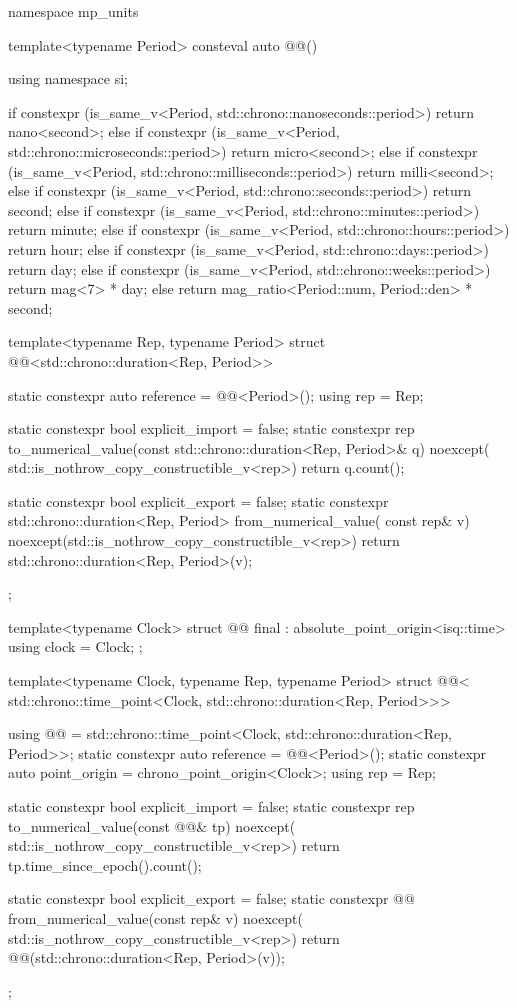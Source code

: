 \begin{codeblock}
namespace mp_units {

template<typename Period>
consteval auto @@()
{
  using namespace si;

  if constexpr (is_same_v<Period, std::chrono::nanoseconds::period>)
    return nano<second>;
  else if constexpr (is_same_v<Period, std::chrono::microseconds::period>)
    return micro<second>;
  else if constexpr (is_same_v<Period, std::chrono::milliseconds::period>)
    return milli<second>;
  else if constexpr (is_same_v<Period, std::chrono::seconds::period>)
    return second;
  else if constexpr (is_same_v<Period, std::chrono::minutes::period>)
    return minute;
  else if constexpr (is_same_v<Period, std::chrono::hours::period>)
    return hour;
  else if constexpr (is_same_v<Period, std::chrono::days::period>)
    return day;
  else if constexpr (is_same_v<Period, std::chrono::weeks::period>)
    return mag<7> * day;
  else
    return mag_ratio<Period::num, Period::den> * second;
}

template<typename Rep, typename Period>
struct @@<std::chrono::duration<Rep, Period>> {
  static constexpr auto reference = @@<Period>();
  using rep = Rep;

  static constexpr bool explicit_import = false;
  static constexpr rep to_numerical_value(const std::chrono::duration<Rep, Period>& q) noexcept(
    std::is_nothrow_copy_constructible_v<rep>)
  {
    return q.count();
  }

  static constexpr bool explicit_export = false;
  static constexpr std::chrono::duration<Rep, Period> from_numerical_value(
    const rep& v) noexcept(std::is_nothrow_copy_constructible_v<rep>)
  {
    return std::chrono::duration<Rep, Period>(v);
  }
};

template<typename Clock>
struct @@ final : absolute_point_origin<isq::time> {
  using clock = Clock;
};

template<typename Clock, typename Rep, typename Period>
struct @@<
  std::chrono::time_point<Clock, std::chrono::duration<Rep, Period>>> {
  using @@ = std::chrono::time_point<Clock, std::chrono::duration<Rep, Period>>;
  static constexpr auto reference = @@<Period>();
  static constexpr auto point_origin = chrono_point_origin<Clock>;
  using rep = Rep;

  static constexpr bool explicit_import = false;
  static constexpr rep to_numerical_value(const @@& tp) noexcept(
    std::is_nothrow_copy_constructible_v<rep>)
  {
    return tp.time_since_epoch().count();
  }

  static constexpr bool explicit_export = false;
  static constexpr @@ from_numerical_value(const rep& v) noexcept(
    std::is_nothrow_copy_constructible_v<rep>)
  {
    return @@(std::chrono::duration<Rep, Period>(v));
  }
};

}
\end{codeblock}
